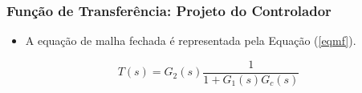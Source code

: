 \documentclass{beamer}
\begin{document}
\begin{frame}
\frametitle{Função de Transferência: Projeto do Controlador}
\begin{itemize}
\item A equação de malha fechada é representada pela Equação (\ref{eqmf}).
\end{itemize}

\begin{equation}\label{eqmf}
T(s) = G_2(s)\frac{1}{1+G_1(s)G_c(s)} 
\end{equation}

\end{frame}



\end{document}
